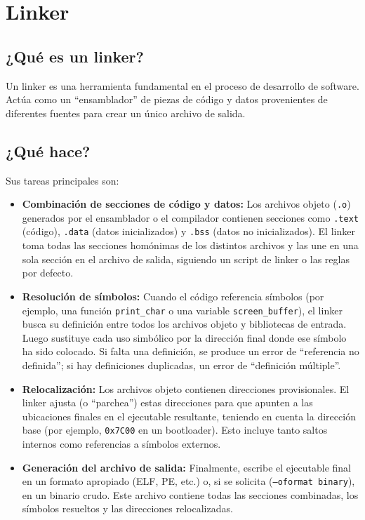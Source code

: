 \documentclass[a4paper,12pt]{article}
\begin{document}
\section{Linker}

\subsection{¿Qué es un linker?}
Un linker es una herramienta fundamental en el proceso de desarrollo de software. Actúa como un “ensamblador” de piezas de código y datos provenientes de diferentes fuentes para crear un único archivo de salida.

\subsection{¿Qué hace?}
Sus tareas principales son:

\begin{itemize}[noitemsep]
  \item \textbf{Combinación de secciones de código y datos:} Los archivos objeto (\texttt{.o}) generados por el ensamblador o el compilador contienen secciones como \texttt{.text} (código), \texttt{.data} (datos inicializados) y \texttt{.bss} (datos no inicializados). El linker toma todas las secciones homónimas de los distintos archivos y las une en una sola sección en el archivo de salida, siguiendo un script de linker o las reglas por defecto.
  
  \item \textbf{Resolución de símbolos:} Cuando el código referencia símbolos (por ejemplo, una función \texttt{print\_char} o una variable \texttt{screen\_buffer}), el linker busca su definición entre todos los archivos objeto y bibliotecas de entrada. Luego sustituye cada uso simbólico por la dirección final donde ese símbolo ha sido colocado. Si falta una definición, se produce un error de “referencia no definida”; si hay definiciones duplicadas, un error de “definición múltiple”.

  \item \textbf{Relocalización:} Los archivos objeto contienen direcciones provisionales. El linker ajusta (o “parchea”) estas direcciones para que apunten a las ubicaciones finales en el ejecutable resultante, teniendo en cuenta la dirección base (por ejemplo, \texttt{0x7C00} en un bootloader). Esto incluye tanto saltos internos como referencias a símbolos externos.

  \item \textbf{Generación del archivo de salida:} Finalmente, escribe el ejecutable final en un formato apropiado (ELF, PE, etc.) o, si se solicita (\texttt{--oformat binary}), en un binario crudo. Este archivo contiene todas las secciones combinadas, los símbolos resueltos y las direcciones relocalizadas.
\end{itemize}
\end{document}

